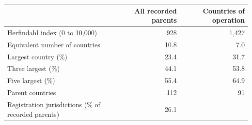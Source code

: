 \begin{tabular}{lrr}
\toprule
 & All recorded parents & Countries of operation \\
\midrule
Herfindahl index (0 to 10,000) & 928 & 1,427 \\
Equivalent number of countries & 10.8 & 7.0 \\
Largest country (\%) & 23.4 & 31.7 \\
Three largest (\%) & 44.1 & 53.8 \\
Five largest (\%) & 55.4 & 64.9 \\
Parent countries & 112 & 91 \\
\midrule
Registration jurisdictions (\% of recorded parents) & 26.1 &  \\
\bottomrule
\end{tabular}
